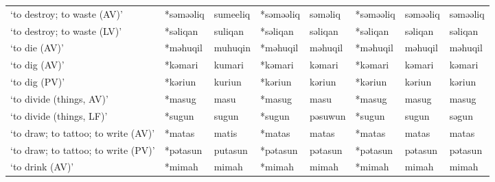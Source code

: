 \begin{landscape}
\begin{longtable}[c]{@{}p{3cm}<{\raggedright}p{2.75cm}<{\raggedright}p{2.75cm}<{\raggedright}p{2.75cm}<{\raggedright}p{2.75cm}<{\raggedright}p{2.75cm}<{\raggedright}p{2.75cm}<{\raggedright}p{2.75cm}<{\raggedright}@{}}
`to destroy; to waste (AV)'                          & *səməəliq    & sumeeliq                      & *səməəliq      & səməliq                    & *səməəliq        & səməəliq                 & səməəliq                          \\
`to destroy; to waste (LV)'                          & *səliqan     & suliqan                       & *səliqan       & səliqan                    & *səliqan         & səliqan                  & səliqan                           \\
`to die (AV)'                                        & *məhuqil     & muhuqin                       & *məhuqil       & məhuqil                    & *məhuqil         & məhuqil                  & məhuqil                           \\
`to dig (AV)'                                        & *kəmari      & kumari                        & *kəmari        & kəmari                     & *kəmari          & kəmari                   & kəmari                            \\
`to dig (PV)'                                        & *kəriun      & kuriun                        & *kəriun        & kəriun                     & *kəriun          & kəriun                   & kəriun                            \\
`to divide (things, AV)'                             & *masug       & masu                          & *masug         & masu                       & *masug           & masug                    & masug                             \\
`to divide (things, LF)'                             & *sugun       & sugun                         & *sugun         & pəsuwun                    & *sugun           & sugun                    & səgun                             \\
`to draw; to tattoo; to write (AV)'                  & *matas       & matis                         & *matas         & matas                      & *matas           & matas                    & matas                             \\
`to draw; to tattoo; to write (PV)'                  & *pətasun     & putasun                       & *pətasun       & pətasun                    & *pətasun         & pətasun                  & pətasun                           \\
`to drink (AV)'                                      & *mimah       & mimah                         & *mimah         & mimah                      & *mimah           & mimah                    & mimah                             \\

\end{longtable}
\end{landscape}
